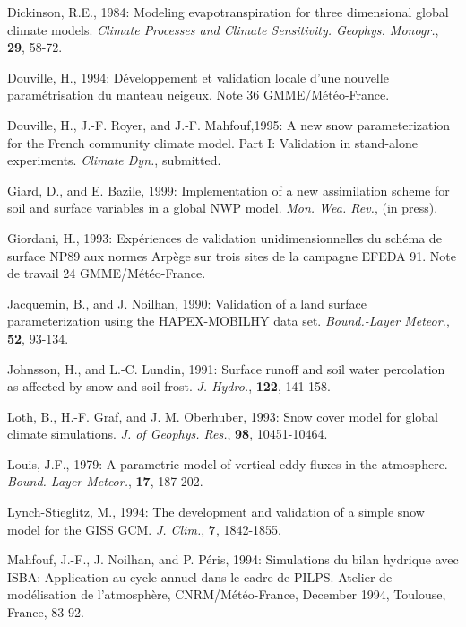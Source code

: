 \begin{description}
\item
Dickinson, R.E., 1984:
Modeling evapotranspiration for three dimensional global
climate models.
{\em Climate Processes and Climate Sensitivity.
Geophys. Monogr.},
{\bf 29},
58-72.

\item
Douville, H., 1994:
D\'eveloppement et validation locale d'une nouvelle
param\'etrisation du manteau neigeux.
Note 36 GMME/M\'et\'eo-France.

\item
Douville, H., J.-F. Royer, and J.-F. Mahfouf,1995:
A new snow parameterization for the French community climate
model.  Part I:  Validation in stand-alone experiments.
{\em Climate Dyn.},
submitted.

\item
Giard, D., and E. Bazile, 1999:
Implementation of a new assimilation scheme for
soil and surface variables in a global NWP model.
{\em Mon. Wea. Rev.},
(in press).

\item
Giordani, H., 1993:
Exp\'eriences de validation unidimensionnelles du sch\'ema
de surface NP89 aux normes Arp\`ege sur trois sites de la
campagne EFEDA 91.
Note de travail 24 GMME/M\'et\'eo-France.

\item
Jacquemin, B., and J. Noilhan, 1990:
Validation of a land surface parameterization using the
HAPEX-MOBILHY data set.
{\em Bound.-Layer Meteor.},
{\bf 52},
93-134.

\item
Johnsson, H., and L.-C. Lundin, 1991:
Surface runoff and soil water percolation as affected by snow
and soil frost.
{\em J. Hydro.},
{\bf 122},
141-158.

\item
Loth, B.,
H.-F. Graf, and J. M. Oberhuber, 1993:
Snow cover model for global climate simulations.
{\em J. of Geophys. Res.},
{\bf 98},
10451-10464.

\item
Louis, J.F., 1979:
A parametric model of vertical eddy fluxes in the atmosphere.
{\em Bound.-Layer Meteor.},
{\bf 17},
187-202.

\item
Lynch-Stieglitz, M., 1994: The development and validation
of a simple snow model for the GISS GCM.
{\em J. Clim.},
{\bf 7},
1842-1855.

\item
Mahfouf, J.-F., J. Noilhan, and P. P\'eris, 1994:
Simulations du bilan hydrique avec ISBA:  Application
au cycle annuel dans le cadre de PILPS.
Atelier de mod\'elisation de l'atmosph\`ere,
CNRM/M\'et\'eo-France,
December 1994, Toulouse, France, 83-92.


\end{description}
